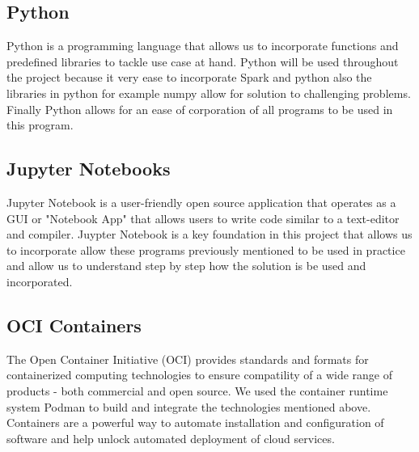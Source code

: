 \documentclass[conference,twoside]{IEEEtran}
\begin{document}
\subsection{Python}
Python is a programming language that allows us to incorporate functions and predefined libraries to tackle use case at hand. Python will be used throughout the project because it very ease to incorporate Spark and python also the libraries in python for example numpy allow for solution to challenging problems. Finally Python allows for an ease of corporation of all programs to be used in this program\cite{python}.

\subsection{Jupyter Notebooks}
Jupyter Notebook is a user-friendly open source application that operates as a GUI or "Notebook App" that allows users to write code similar to a text-editor and compiler. Juypter Notebook is a key foundation in this project that allows us to incorporate allow these programs previously mentioned to be used in practice and allow us to understand step by step how the solution is be used and incorporated\cite{jupyter}.


\subsection{OCI Containers}
The Open Container Initiative (OCI) provides standards and formats for containerized computing technologies to ensure compatility of a wide range of products - both commercial and open source\cite{OCI}. We used the container runtime system Podman\cite{rhelpodman} to build and integrate the technologies mentioned above. Containers are a powerful way to automate installation and configuration of software and help unlock automated deployment of cloud services\cite{gartnercontainer}.
\end{document}
